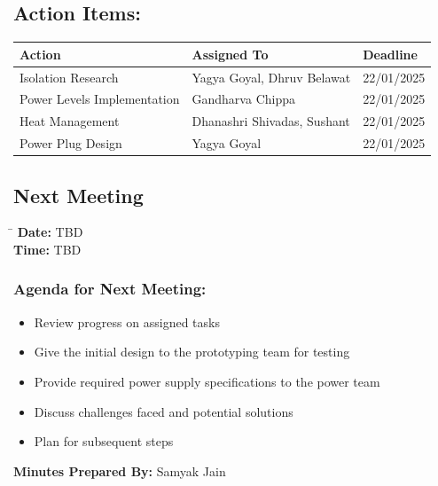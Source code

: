 \documentclass[12pt,a4paper]{article}
\begin{document}
\subsection*{Action Items:}
\renewcommand{\arraystretch}{1.5}
\begin{tabular}{|m{6cm}|m{4cm}|m{4cm}|}
    \hline
    \textbf{Action} & \textbf{Assigned To} & \textbf{Deadline} \\
    \hline
    Isolation Research & Yagya Goyal, Dhruv Belawat & 22/01/2025 \\
    \hline
    Power Levels Implementation & Gandharva Chippa & 22/01/2025 \\
    \hline
    Heat Management & Dhanashri Shivadas, Sushant & 22/01/2025 \\
    \hline
    Power Plug Design & Yagya Goyal & 22/01/2025 \\
    \hline
\end{tabular}



\subsection*{Next Meeting}
\begin{tabbing}
    \hspace{3cm} \= \hspace{10cm} \kill
    \textbf{Date:} \> TBD \\
    \textbf{Time:} \> TBD \\
\end{tabbing}   

\subsubsection*{Agenda for Next Meeting:}
    \begin{itemize}
        \item Review progress on assigned tasks
        \item Give the initial design to the prototyping team for testing
        \item Provide required power supply specifications to the power team
        \item Discuss challenges faced and potential solutions
        \item Plan for subsequent steps
    \end{itemize}



\textbf{Minutes Prepared By:} Samyak Jain
\end{document}
